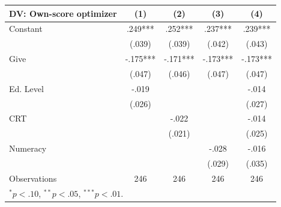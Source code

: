 \begingroup
\centering
\begin{tabular*}{\linewidth}{@{\extracolsep{\fill}}lcccc}
   \toprule
   DV: Own-score optimizer & \multicolumn{1}{c}{(1)} & \multicolumn{1}{c}{(2)} & \multicolumn{1}{c}{(3)} & \multicolumn{1}{c}{(4)}\\
   \midrule
   Constant & \mbox{\hphantom{8}.249***} & \mbox{\hphantom{8}.252***} & \mbox{\hphantom{8}.237***} & \mbox{\hphantom{8}.239***}\\
    & \mbox{(.039)\hphantom{88}} & \mbox{(.039)\hphantom{88}} & \mbox{(.042)\hphantom{88}} & \mbox{(.043)\hphantom{88}}\\
   Give & \mbox{-.175***} & \mbox{-.171***} & \mbox{-.173***} & \mbox{-.173***}\\
    & \mbox{(.047)\hphantom{88}} & \mbox{(.046)\hphantom{88}} & \mbox{(.047)\hphantom{88}} & \mbox{(.047)\hphantom{88}}\\
   Ed. Level & \mbox{-.019\hphantom{888}} &  &  & \mbox{-.014\hphantom{888}}\\
    & \mbox{(.026)\hphantom{88}} &  &  & \mbox{(.027)\hphantom{88}}\\
   CRT &  & \mbox{-.022\hphantom{888}} &  & \mbox{-.014\hphantom{888}}\\
    &  & \mbox{(.021)\hphantom{88}} &  & \mbox{(.025)\hphantom{88}}\\
   Numeracy &  &  & \mbox{-.028\hphantom{888}} & \mbox{-.016\hphantom{888}}\\
    &  &  & \mbox{(.029)\hphantom{88}} & \mbox{(.035)\hphantom{88}}\\
   \midrule
   Observations & 246 & 246 & 246 & 246\\
   \multicolumn{5}{l}{\footnotesize $^{*}p<.10$, $^{**}p<.05$, $^{***}p<.01$.}\\
   \bottomrule
\end{tabular*}
\par\endgroup
